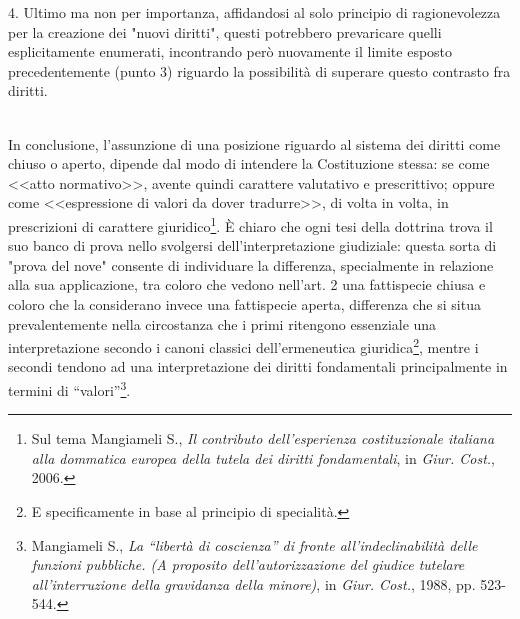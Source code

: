 4. Ultimo ma non per importanza, affidandosi al solo principio di ragionevolezza per la creazione dei "nuovi diritti", questi potrebbero prevaricare quelli esplicitamente enumerati, incontrando però nuovamente il limite esposto precedentemente (punto 3) riguardo la possibilità di superare questo contrasto fra diritti.
\begin{comment}Vicenda simile si è verificata nelle corti americane, che sebbene facenti parte di un sistema di common law che prevede l'utilizzo del precedente, ha avuto "problematiche" rispetto all'interpretazione del IX emendamento al pari di quello che nelle corti italiane si è avuto rispetto all'interpretazione dell'art. 2.
L'america si divise in due linee ermeneutiche ben distinte: la lettura ampia, che vedeva il IX emendamento come norma di produzione del diritto, e la lettura restrittiva, che considerava invece il IX emendamento come norma di interpretazione.
La prima consentiva il riconoscimento di un numero illimitato di diritti fondamentali, mentre la seconda si trovava ad essere più che altro una norma "istruzione", ossia su come leggere la costituzionale, consentendo quindi l'emersione sì di diritti impliciti nel dettato costituzionale stesso, ma limitati ad una riconducibilità diretta alla stessa.
Il fulcro sta anche in questo caso nel riconoscere il valore della certezza del diritto e la necessità di vagliaare sempre le scelte degli interpreti con i filtri apprestati dall'ordinamento nel riconoscimento di un nuovo diritto, ma bilanciandolo con l'esigenza di estendere il carattere <<fondamentale>> a nuovi interesse emergenti.\end{comment}
\\In conclusione, l’assunzione di una posizione riguardo al sistema dei diritti come chiuso o aperto, dipende dal modo di intendere la Costituzione stessa: se come <<atto normativo>>, avente quindi carattere valutativo e prescrittivo; oppure come <<espressione di valori da dover tradurre>>, di volta in volta, in prescrizioni di carattere giuridico\footnote{Sul tema Mangiameli S., \textit{Il contributo dell’esperienza costituzionale italiana alla dommatica europea della tutela dei diritti fondamentali}, in \textit{Giur. Cost.}, 2006.}.
È chiaro che ogni tesi della dottrina trova il suo banco di prova nello svolgersi dell’interpretazione giudiziale: questa sorta di "prova del nove" consente di individuare la differenza, specialmente in relazione alla sua applicazione, tra coloro che vedono nell’art. 2 una fattispecie chiusa e coloro che la considerano invece una fattispecie aperta, differenza che si situa prevalentemente nella circostanza che i primi ritengono essenziale una interpretazione secondo i canoni classici dell’ermeneutica giuridica\footnote{E specificamente in base al principio di specialità.}, mentre i secondi tendono ad una interpretazione dei diritti fondamentali principalmente in termini di “valori”\footnote{Mangiameli S., \textit{La “libertà di coscienza” di fronte all’indeclinabilità delle funzioni pubbliche. (A proposito dell’autorizzazione del giudice tutelare all’interruzione della gravidanza della minore)}, in \textit{Giur. Cost.}, 1988, pp. 523-544.}.
